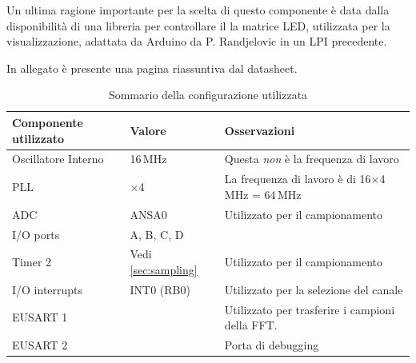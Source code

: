 Un ultima ragione importante per la scelta di questo componente \`e data dalla
disponibilit\`a di una libreria per controllare il la matrice LED, utilizzata
per la visualizzazione, adattata da Arduino da P. Randjelovic in un LPI
precedente.

In allegato \`e presente una pagina riassuntiva dal datasheet.

\begin{table}[H] \centering
    \caption{Sommario della configurazione utilizzata}
    \begin{tabularx}{\textwidth}{l l X}
        \toprule
        \bfseries Componente utilizzato & \bfseries Valore & \bfseries Osservazioni \\
        \midrule
        Oscillatore Interno & 16\,MHz & 
            Questa \emph{non} \`e la frequenza di lavoro \\
        PLL & \(\times\)4 & 
            La frequenza di lavoro \`e di 16\(\times\)4\,MHz = 64\,MHz \\
        ADC & \ttfamily ANSA0 &
            Utilizzato per il campionamento \\
        I/O ports & \ttfamily A, B, C, D & \\
        Timer 2 & Vedi \ref{sec:sampling} & Utilizzato per il campionamento \\
        I/O interrupts & \ttfamily INT0 (RB0) &
            Utilizzato per la selezione del canale \\
        EUSART 1 & & 
            Utilizzato per trasferire i campioni della FFT. \\
        EUSART 2 & &
            Porta di debugging \\
        \bottomrule
    \end{tabularx}
\end{table}


